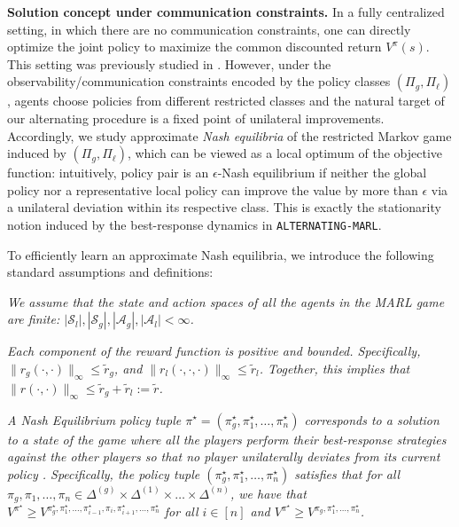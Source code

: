 \textbf{Solution concept under communication constraints.}
In a fully centralized setting, in which there are no communication constraints, one can directly optimize the joint policy to maximize the common discounted return $V^{\pi}(s)$. This setting was previously studied in \citet{anand2025meanfield}. 
However, under the observability/communication constraints encoded by the policy classes $(\Pi_g,\Pi_\ell)$, agents choose policies from different restricted classes and the natural target of our alternating procedure is a fixed point of unilateral improvements.
Accordingly, we study approximate \emph{Nash equilibria} of the restricted Markov game induced by $(\Pi_g,\Pi_\ell)$, which can be viewed as a local optimum of the objective function: intuitively, policy pair is an $\epsilon$-Nash equilibrium if neither the global policy nor a representative local policy can improve the value by more than $\epsilon$ via a unilateral deviation within its respective class.
This is exactly the stationarity notion induced by the best-response dynamics in \texttt{ALTERNATING-MARL}.



To efficiently learn an approximate Nash equilibria, we introduce the following standard assumptions and definitions:
\begin{assumption}\label{assumption: finite cardinality}
    \emph{We assume that the state and action spaces of all the agents in the MARL game are finite:  $|\mathcal{S}_l|, |\mathcal{S}_g|, |\mathcal{A}_g|, |\mathcal{A}_l| < \infty$.  }
\end{assumption}
\begin{assumption}\label{assumption: bounded rewards}
    \emph{Each component of the reward function is positive and bounded. Specifically, $\|r_g(\cdot,\cdot)\|_\infty \leq \tilde{r}_g$, and
    $\|r_l(\cdot,\cdot,\cdot)\|_\infty \leq \tilde{r}_l$. Together, this implies that $\|r(\cdot,\cdot)\|_\infty \leq \tilde{r}_g + \tilde{r}_l := \tilde{r}$.}
\end{assumption}

\begin{definition} \label{def: a nash equilibrium} \emph{A Nash Equilibrium policy tuple $\pi^\star = (\pi_g^\star,\pi_1^\star,\dots,\pi_n^\star)$ corresponds to a solution to a state of the game where all the players perform their best-response strategies against the other players so that no player unilaterally deviates from its current policy \cite{doi:10.1073/pnas.36.1.48}. Specifically, the policy tuple $(\pi_g^\star,\pi_1^\star,\dots,\pi_n^\star)$ satisfies that for all $\pi_g, \pi_1, \dots, \pi_n \in \Delta^{(g)}\times\Delta^{(1)}\times\dots\times\Delta^{(n)}$, we have that $V^{\pi^\star}\geq V^{\pi_g^\star,\pi_1^\star,\dots,\pi_{i-1}^\star,\pi_i,\pi_{i+1}^\star,\dots,\pi_n^\star}$ for all $i\in[n]$ and $V^{\pi^\star}\geq V^{\pi_g,\pi_1^\star,\dots,\pi_n^\star}$.}
\end{definition}
 

